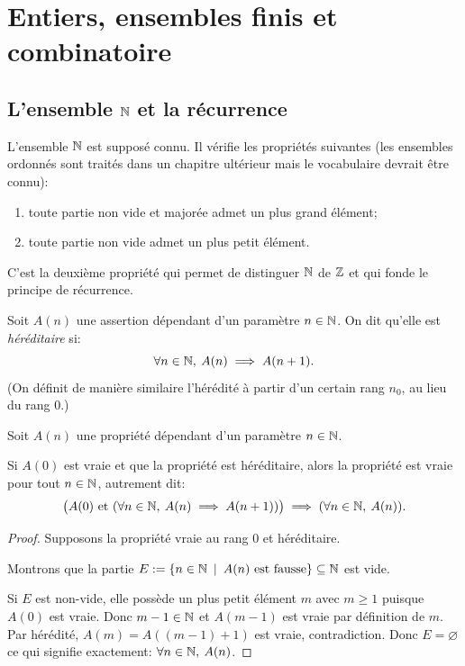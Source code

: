 \chapter{Entiers, ensembles finis et combinatoire}
\minitoc
\hyperlink{toc}{\retourTOC}

\section{L'ensemble $\N$ et la récurrence}
\index{$\N$}

L'ensemble $\N$ est supposé connu. Il vérifie les propriétés suivantes (les ensembles ordonnés sont traités dans un chapitre ultérieur mais le vocabulaire devrait être connu):
\begin{enumerate}
\item toute partie non vide et majorée admet un plus grand élément;
\item toute partie non vide admet un plus petit élément.
\end{enumerate}

C'est la deuxième propriété qui permet de distinguer $\N$ de $\mathbb{Z}$ et qui fonde le principe de récurrence.


\begin{definition}
Soit $A(n)$ une assertion dépendant d'un paramètre $n\in \mathbb{N}$. 
On dit qu'elle est \emph{héréditaire} si:
\[
\forall n\in \mathbb{N},\: A(n)\implies A(n+1).
\]
(On définit de manière similaire l'hérédité à partir d'un certain rang $n_0$, au lieu du rang $0$.)
\end{definition}

\begin{theoreme}
Soit $A(n)$ une propriété dépendant d'un paramètre $n\in \mathbb{N}$. 

Si $A(0)$ est vraie et que la propriété est héréditaire, alors la propriété est vraie pour tout $n\in\mathbb{N}$, autrement dit:
\[
\big( A(0) \text{ et }(\forall n\in \mathbb{N},\: A(n)\implies A(n+1))\big) \implies (\forall n\in \mathbb{N}, \: A(n)).
\]
\end{theoreme}
\begin{proof}Supposons la propriété vraie au rang $0$ et héréditaire.

Montrons que la partie $E := \{n\in \N\:\mid\: A(n)\text{ est fausse}\} \subseteq \N$ est vide.

Si $E$ est non-vide, elle possède un plus petit élément $m$ avec $m\geq 1$ puisque $A(0)$ est vraie. Donc $m-1 \in \mathbb{N}$ et $A(m-1)$ est vraie par définition de $m$. Par hérédité, $A(m)=A((m-1)+1)$ est vraie, contradiction. Donc $E=\varnothing$ ce qui signifie exactement: $\forall n \in\mathbb{N},\:A(n)$.
\end{proof}

